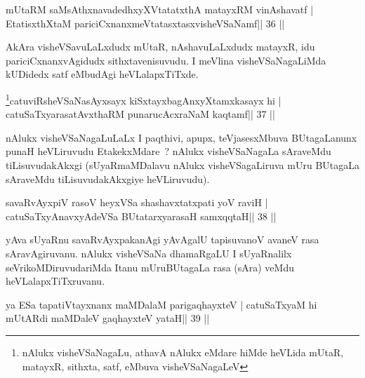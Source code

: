 

\begin{shl}
mUtaRM saMsAthxnavadedhxyXVtatatxthA matayxRM vinAshavatf |
EtatisxthXtaM pariciCxnanxmeVtatasxtasxvisheVSaNamf\hfill || 36 ||
\end{shl}

\begin{artha}
AkAra visheVSavuLaLxdudx mUtaR, nAshavuLaLxdudx matayxR, idu
pariciCxnanxvAgidudx sithxtavenisuvudu. I meVlina visheVSaNagaLiMda
kUDidedx satf eMbudAgi heVLalapxTiTxde.
\end{artha}


\begin{shl}
\footnote{nAlukx visheVSaNagaLu, athavA nAlukx eMdare hiMde
heVLida mUtaR, matayxR, sithxta, satf, eMbuva visheVSaNagaLeV}catuviRsheVSaNasAyxsayx kiSxtayxbagAnxyXtamxkasayx hi |
\footnotemark[\value{footnote}]catuSaTxyarasatAvxthaRM punarucAcxraNaM kaqtamf\hfill || 37 ||
\end{shl}

\begin{artha}
nAlukx visheVSaNagaLuLaLx I paqthivi, apupx, teVjasesxMbuva BUtagaLanunx punaH heVLiruvudu EtakekxMdare~? nAlukx visheVSaNagaLa sAraveMdu tiLisuvudakAkxgi  (sUyaRmaMDalavu nAlukx visheVSagaLiruva mUru BUtagaLa sAraveMdu tiLisuvudakAkxgiye heVLiruvudu).
\end{artha}



\begin{shl}
savaRvAyxpiV rasoV heyxVSa shashavxtatxpati yoV raviH |
\footnotemark[1]catuSaTxyAnavxyAdeVSa BUtatarxyarasaH samxqqtaH\hfill || 38 ||
\end{shl}

\begin{artha}
yAva sUyaRnu savaRvAyxpakanAgi yAvAgalU tapisuvanoV avaneV rasa sAravAgiruvanu. nAlukx visheVSaNa dhamaRgaLU I sUyaRnalilx seVrikoMDiruvudariMda Itanu mUruBUtagaLa rasa (sAra) veMdu heVLalapxTiTxruvanu.
\end{artha}



\begin{shl}
ya ESa tapatiVtayxnanx maMDalaM parigaqhayxteV |
catuSaTxyaM hi mUtARdi maMDaleV gaqhayxteV yataH\hfill || 39 ||
\end{shl}

